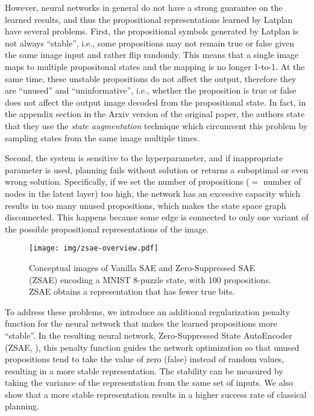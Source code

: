 However,
neural networks in general do not have a strong guarantee on the learned results,
and thus the propositional representations learned by Latplan have several problems.
First, the propositional symbols generated by Latplan is not always
``stable'', i.e., some propositions may not remain true or false given the same image input
and rather flip randomly.
This means that a single image maps to multiple propositonal states and the mapping is
no longer 1-to-1.
% 
At the same time, these unstable propositions do not affect the output, therefore they are
``unused'' and ``uninformative'', i.e.,
whether the proposition is true or false does not affect the output image decoded from the propositional state.
In fact, in the appendix section in the Arxiv version of the original paper,
the authors state that they use the \emph{state augmentation} technique
which circumvent this problem by sampling states from the same image multiple times.

Second, the system is sensitive to the hyperparameter, and if inappropriate parameter
is used, planning fails without solution or returns a suboptimal or even wrong solution.
Specifically, if we set the number of propositions ($=$ number of nodes in the latent layer) too high, the network
has an excessive capacity which results in too many unused propositions,
which makes the state space graph disconnected.
This happens because some edge is connected to only one variant of
the possible propositional representations of the image.

\begin{figure}[htb]
 \centering
 \texttt{[image: img/zsae-overview.pdf]}
 \caption{
Conceptual images of Vanilla SAE and Zero-Suppressed SAE (ZSAE) encoding a MNIST 8-puzzle state, with 100 propositions.
ZSAE obtains a representation that has fewer true bits.}
 \label{zsae-overview}
\end{figure}

To address these problems,
we introduce an additional regularization penalty function for the neural network 
that makes the learned propositions more ``stable''. In the resulting neural network,
Zero-Suppressed State AutoEncoder (ZSAE, ), this penalty function
guides the network optimization so that unused propositions tend to 
take the value of zero (false) instead of random values,
resulting in a more stable representation.
The stability can be measured by taking the variance of the representation from the same set of inputs.
We also show that a more stable representation results in a higher success rate of classical planning.

